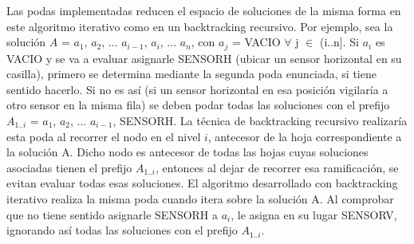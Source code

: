 \medskip
\par{Las podas implementadas reducen el espacio de soluciones de la misma forma en este algoritmo iterativo como en un backtracking recursivo. Por ejemplo, sea la soluci\'on $A$ = $a_{1}$, $a_{2}$, ... $a_{i-1}$, $a_i$, ... $a_n$, con $a_{j}$ = VACIO $\forall$ j $\in$ (i..n]. Si $a_i$ es VACIO y se va a evaluar asignarle SENSORH (ubicar un sensor horizontal en su casilla), primero se determina mediante la segunda poda enunciada, si tiene sentido hacerlo. Si no es as\'i (si un sensor horizontal en esa posici\'on vigilar\'ia a otro sensor en la misma fila) se deben podar todas las soluciones con el prefijo $A_{1..i}$ = $a_1$, $a_2$, ... $a_{i-1}$, SENSORH. La t\'ecnica de backtracking recursivo realizar\'ia esta poda al recorrer el nodo en el nivel $i$, antecesor de la hoja correspondiente a la soluci\'on A. Dicho nodo es antecesor de todas las hojas cuyas soluciones asociadas tienen el prefijo $A_{1..i}$, entonces al dejar de recorrer esa ramificaci\'on, se evitan evaluar todas esas soluciones. El algoritmo desarrollado con backtracking iterativo realiza la misma poda cuando itera sobre la soluci\'on A. Al comprobar que no tiene sentido asignarle SENSORH a $a_i$, le asigna en su lugar SENSORV, ignorando as\'i todas las soluciones con el prefijo $A_{1..i}$.}

\newpage

